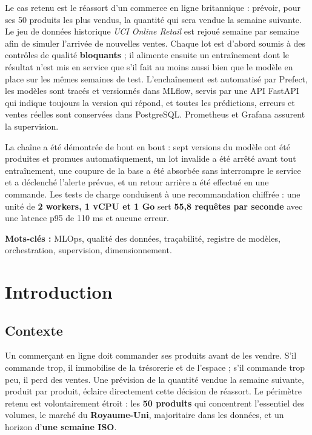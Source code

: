 \documentclass[11pt,a4paper]{article}
\begin{document}
Le cas retenu est le réassort d'un commerce en ligne britannique : prévoir, pour ses 50
produits les plus vendus, la quantité qui sera vendue la semaine suivante. Le jeu de
données historique \emph{UCI Online Retail} est rejoué semaine par semaine afin de simuler
l'arrivée de nouvelles ventes. Chaque lot est d'abord soumis à des contrôles de qualité
\textbf{bloquants} ; il alimente ensuite un entraînement dont le résultat n'est mis en
service que s'il fait au moins aussi bien que le modèle en place sur les mêmes semaines de
test. L'enchaînement est automatisé par Prefect, les modèles sont tracés et versionnés dans
MLflow, servis par une API FastAPI qui indique toujours la version qui répond, et toutes
les prédictions, erreurs et ventes réelles sont conservées dans PostgreSQL. Prometheus et
Grafana assurent la supervision.

La chaîne a été démontrée de bout en bout : sept versions du modèle ont été produites et
promues automatiquement, un lot invalide a été arrêté avant tout entraînement, une coupure
de la base a été absorbée sans interrompre le service et a déclenché l'alerte prévue, et un
retour arrière a été effectué en une commande. Les tests de charge conduisent à une
recommandation chiffrée : une unité de \textbf{2 workers, 1 vCPU et 1 Go} sert
\textbf{55,8 requêtes par seconde} avec une latence p95 de 110 ms et aucune erreur.

\vspace{0.3cm}
\noindent\textbf{Mots-clés :} MLOps, qualité des données, traçabilité, registre de modèles,
orchestration, supervision, dimensionnement.

\newpage
\tableofcontents
\newpage

\section{Introduction}

\subsection{Contexte}

Un commerçant en ligne doit commander ses produits avant de les vendre. S'il commande trop,
il immobilise de la trésorerie et de l'espace ; s'il commande trop peu, il perd des ventes.
Une prévision de la quantité vendue la semaine suivante, produit par produit, éclaire
directement cette décision de réassort. Le périmètre retenu est volontairement étroit : les
\textbf{50 produits} qui concentrent l'essentiel des volumes, le marché du
\textbf{Royaume-Uni}, majoritaire dans les données, et un horizon d'\textbf{une semaine ISO}.
\end{document}
